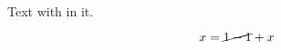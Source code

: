 \documentclass{article}
\begin{document}
Text with  in it.

\[ x = \cancel{1 - 1} + x \]
\end{document}
